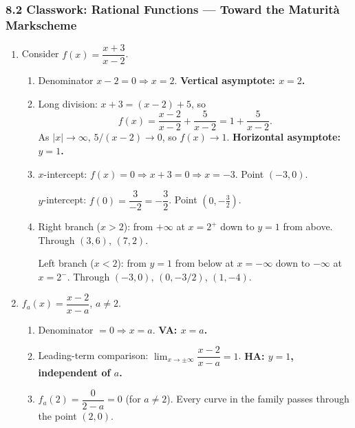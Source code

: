 \documentclass[12pt, twoside]{article}
\begin{document}
\subsubsection*{8.2 Classwork: Rational Functions --- Toward the Maturit\`a \,\textemdash\, Markscheme}

\begin{enumerate}[itemsep=0.3cm]

\item Consider $\displaystyle f(x)=\dfrac{x+3}{x-2}$.

\begin{enumerate}[label=(\alph*), itemsep=0.2cm]
  \item Denominator $x-2=0\Rightarrow x=2$.
  \textbf{Vertical asymptote: $x=2$.}

  \item Long division: $x+3=(x-2)+5$, so
  \[
  f(x)=\dfrac{x-2}{x-2}+\dfrac{5}{x-2}=1+\dfrac{5}{x-2}.
  \]
  As $|x|\to\infty$, $5/(x-2)\to 0$, so $f(x)\to 1$.
  \textbf{Horizontal asymptote: $y=1$.}

  \item $x$-intercept: $f(x)=0\Rightarrow x+3=0\Rightarrow x=-3$. Point $(-3,0)$.

  $y$-intercept: $f(0)=\dfrac{3}{-2}=-\dfrac{3}{2}$. Point $\left(0,-\tfrac{3}{2}\right)$.

  \item Right branch ($x>2$): from $+\infty$ at $x=2^+$ down to $y=1$ from above.
  Through $(3,6)$, $(7,2)$.

  Left branch ($x<2$): from $y=1$ from below at $x=-\infty$ down to $-\infty$ at
  $x=2^-$. Through $(-3,0)$, $(0,-3/2)$, $(1,-4)$.
\end{enumerate}

\medskip

\item $\displaystyle f_a(x)=\dfrac{x-2}{x-a}$, $a\ne 2$.

\begin{enumerate}[label=(\alph*), itemsep=0.2cm]
  \item Denominator $=0\Rightarrow x=a$. \textbf{VA: $x=a$.}

  \item Leading-term comparison: $\lim_{x\to\pm\infty}\dfrac{x-2}{x-a}=1$.
  \textbf{HA: $y=1$, independent of $a$.}

  \item $f_a(2)=\dfrac{0}{2-a}=0$ (for $a\ne 2$).
  Every curve in the family passes through the point $(2,0)$.


\end{enumerate}
\end{enumerate}
\end{document}
